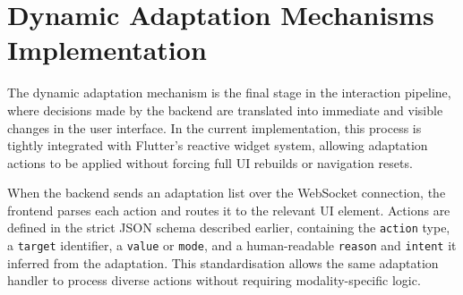 \documentclass[openany]{book}
\begin{document}
\section{Dynamic Adaptation Mechanisms Implementation}
The dynamic adaptation mechanism is the final stage in the interaction pipeline, where decisions made by the backend are translated into immediate and visible changes in the user interface. In the current implementation, this process is tightly integrated with Flutter’s reactive widget system, allowing adaptation actions to be applied without forcing full UI rebuilds or navigation resets.

When the backend sends an adaptation list over the WebSocket connection, the frontend parses each action and routes it to the relevant UI element. Actions are defined in the strict JSON schema described earlier, containing the \texttt{action} type, a \texttt{target} identifier, a \texttt{value} or \texttt{mode}, and a human-readable \texttt{reason} and \texttt{intent} it inferred from the adaptation. This standardisation allows the same adaptation handler to process diverse actions without requiring modality-specific logic.
\end{document}
